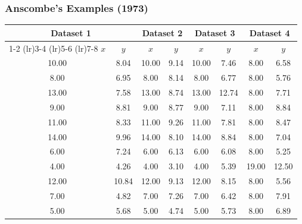 \documentclass[10pt]{beamer} %
\begin{document}
\begin{frame}
   \frametitle{Anscombe's Examples (1973)}
   \begin{table}[ht]\scriptsize
      \centering
      \begin{tabular}{c@{\hspace{2mm}}cc@{\hspace{2mm}}cc@{\hspace{2mm}}cc@{\hspace{2mm}}c}
         \toprule
         \multicolumn{2}{c}{Dataset 1} &
         \multicolumn{2}{c}{Dataset 2} &
         \multicolumn{2}{c}{Dataset 3} &
         \multicolumn{2}{c}{Dataset 4} \\
         \cmidrule(lr){1-2}
         \cmidrule(lr){3-4}
         \cmidrule(lr){5-6}
         \cmidrule(lr){7-8}
         $x$ & $y$ & $x$ & $y$ & $x$ & $y$ & $x$ & $y$ \\ 
         \midrule
         10.00 & 8.04 & 10.00 & 9.14 & 10.00 & 7.46 & 8.00 & 6.58 \\ 
         8.00 & 6.95 & 8.00 & 8.14 & 8.00 & 6.77 & 8.00 & 5.76 \\ 
         13.00 & 7.58 & 13.00 & 8.74 & 13.00 & 12.74 & 8.00 & 7.71 \\ 
         9.00 & 8.81 & 9.00 & 8.77 & 9.00 & 7.11 & 8.00 & 8.84 \\ 
         11.00 & 8.33 & 11.00 & 9.26 & 11.00 & 7.81 & 8.00 & 8.47 \\ 
         14.00 & 9.96 & 14.00 & 8.10 & 14.00 & 8.84 & 8.00 & 7.04 \\ 
         6.00 & 7.24 & 6.00 & 6.13 & 6.00 & 6.08 & 8.00 & 5.25 \\ 
         4.00 & 4.26 & 4.00 & 3.10 & 4.00 & 5.39 & 19.00 & 12.50 \\ 
         12.00 & 10.84 & 12.00 & 9.13 & 12.00 & 8.15 & 8.00 & 5.56 \\ 
         7.00 & 4.82 & 7.00 & 7.26 & 7.00 & 6.42 & 8.00 & 7.91 \\ 
         5.00 & 5.68 & 5.00 & 4.74 & 5.00 & 5.73 & 8.00 & 6.89 \\ 
         \bottomrule
      \end{tabular}
   \end{table}
\end{frame}
\end{document}
